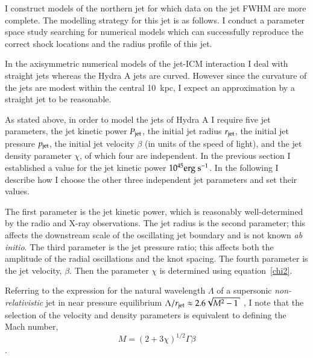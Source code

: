 I construct models of the northern jet for which data on the jet FWHM are more complete. The modelling strategy for this jet is as follows. I conduct a parameter space study searching for numerical models which can successfully reproduce the correct shock locations and the radius profile of this jet. 

In the axisymmetric numerical models of the jet-ICM interaction I deal with straight jets whereas the Hydra A jets are curved. However since the curvature of the jets are modest within the central 10~kpc, I expect an approximation by a straight jet to be reasonable.

As stated above, in order to model the jets of Hydra A I require five jet parameters, the jet kinetic power $P_{\rm{jet}}$, the initial jet radius $r_{\rm{jet}}$, the initial jet pressure $p_{\rm{jet}}$, the initial jet velocity $\beta$ (in units of the speed of light), and the jet density parameter $\chi$, of which four are independent. In the previous section I established a value for the jet kinetic power $10^{45} \rm erg \ s^{-1}$. In the following I describe how I choose the other three independent jet parameters and set their values. 

The first parameter is the jet kinetic power, which is reasonably well-determined by the radio and X-ray observations. The jet radius is the second parameter; this affects the downstream scale of the oscillating jet boundary and is not known \emph{ab initio}. The third parameter is the jet pressure ratio; this affects both the amplitude of the radial oscillations and the knot spacing. The fourth parameter is the jet velocity, $\beta$. Then the parameter $\chi$ is determined using equation~\ref{chi2}.

Referring to the expression for the natural wavelength $\Lambda$ of a supersonic \emph{non-relativistic} jet in near pressure equilibrium $\Lambda/r_{\rm jet} \approx 2.6 \sqrt{M^2 - 1}$
\citep{birkhoff57a}, I note that the selection of the velocity and density parameters is equivalent to defining the Mach number, 
\begin{equation}
M = (2+3 \chi)^{1/2} \Gamma \beta
\end{equation} 
\citep{bicknell94a}. 

